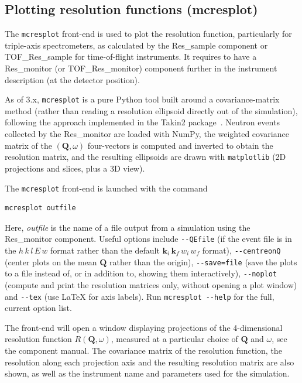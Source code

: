 \subsection{Plotting resolution functions (mcresplot)}
\label{s:mcresplot}

The \verb+mcresplot+ front-end is used to plot the resolution function,
particularly for triple-axis
spectrometers, as calculated by the Res\_sample component or TOF\_Res\_sample
for time-of-flight instruments. It requires to have a Res\_monitor (or
TOF\_Res\_monitor) component further in the instrument description (at the
detector position).

As of \MCS 3.x, \verb+mcresplot+ is a pure Python tool built around a
covariance-matrix method (rather than reading a resolution ellipsoid
directly out of the simulation), following the approach implemented in the
Takin2 package~\cite{takin2}. Neutron events collected by the Res\_monitor
are loaded with NumPy, the weighted covariance matrix of the
$(\boldsymbol{Q},\omega)$ four-vectors is computed and inverted to obtain
the resolution matrix, and the resulting ellipsoids are drawn with
\texttt{matplotlib} (2D projections and slices, plus a 3D view).

The \verb+mcresplot+ front-end is launched with the command
\begin{lstlisting}
mcresplot outfile
\end{lstlisting}
Here, \textit{outfile\/} is the name of a file output from a simulation using
the Res\_monitor component. Useful options include \verb+--QEfile+ (if the
event file is in the $h\,k\,l\,E\,w$ format rather than the default
$\mathbf{k}_i\,\mathbf{k}_f\,w_i\,w_f$ format), \verb+--centreonQ+ (center
plots on the mean $\boldsymbol{Q}$ rather than the origin), \verb+--save=file+
(save the plots to a file instead of, or in addition to, showing them
interactively), \verb+--noplot+ (compute and print the resolution matrices
only, without opening a plot window) and \verb+--tex+ (use \LaTeX{} for axis
labels). Run \verb+mcresplot --help+ for the full, current option list.

The front-end will open a window displaying projections of the 4-dimensional
resolution function $R(\boldsymbol{Q}, \omega)$, measured at a
particular choice of $\boldsymbol{Q}$ and $\omega$, see the component
manual. The covariance matrix of the
resolution function, the resolution along each projection axis and the resulting
resolution matrix are also shown, as well as the instrument name and parameters
used for the simulation.

